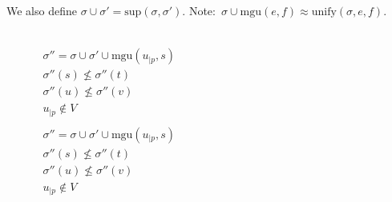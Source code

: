 We also define $\sigma \cup \sigma' = \text{sup}({\sigma, \sigma'})$.
Note:~$\sigma \cup \text{mgu}(e,f) \approx \text{unify}(\sigma, e, f)$.

\begin{figure}
  \begin{center}

    \DP{} \\[12pt]

    \DP{}
    $\begin{matrix}
        \sigma'' = \sigma \cup \sigma' \cup \text{mgu}(u_{|p}, s) \\
        \sigma''(s) \not\leq \sigma''(t) \\
        \sigma''(u) \not\leq \sigma''(v) \\
        u_{|p} \not\in V \\
    \end{matrix}$ \\[12pt]

    \DP{}
    $\begin{matrix}
        \sigma'' = \sigma \cup \sigma' \cup \text{mgu}(u_{|p}, s) \\
        \sigma''(s) \not\leq \sigma''(t) \\
        \sigma''(u) \not\leq \sigma''(v) \\
        u_{|p} \not\in V \\
    \end{matrix}$ \\[12pt]

    \doubleLine{}
    \UIC{}
    \DP{} \\[12pt]

    \doubleLine{}
    \DP{} \\[12pt]

    \doubleLine{}
    \DP{} \\[12pt]


\end{center}
\end{figure}

